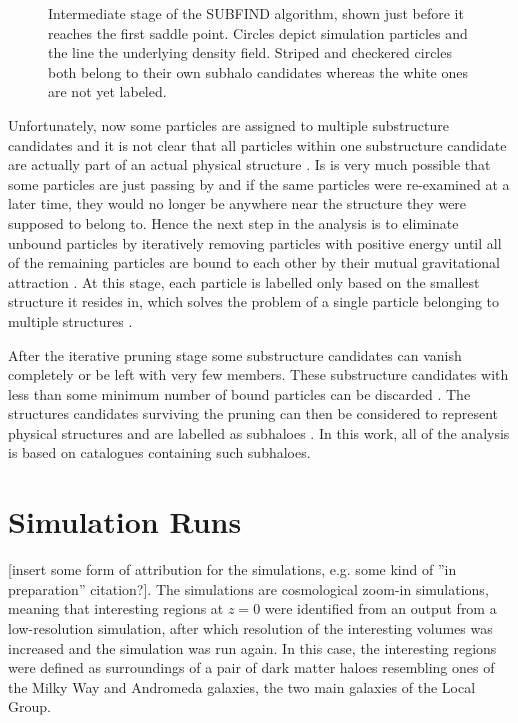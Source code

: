 \documentclass[english, oneside]{HYgradu}
\begin{document}
\begin{figure}
    \centering
    
    \caption{Intermediate stage of the SUBFIND algorithm, shown just before it reaches the first saddle point. Circles depict simulation particles and the line the underlying density field. Striped and checkered circles both belong to their own subhalo candidates whereas the white ones are not yet labeled.}\label{fig:subfind}
\end{figure}

Unfortunately, now some particles are assigned to multiple substructure candidates and it is not clear that all particles within one substructure candidate are actually part of an actual physical structure \citep{springel2001populating}. Is is very much possible that some particles are just passing by and if the same particles were re-examined at a later time, they would no longer be anywhere near the structure they were supposed to belong to. Hence the next step in the analysis is to eliminate unbound particles by iteratively removing particles with positive energy until all of the remaining particles are bound to each other by their mutual gravitational attraction \citep{springel2001populating}. At this stage, each particle is labelled only based on the smallest structure it resides in, which solves the problem of a single particle belonging to multiple structures \citep{springel2001populating}.

After the iterative pruning stage some substructure candidates can vanish completely or be left with very few members. These substructure candidates with less than some minimum number of bound particles can be discarded \citep{springel2001populating}. The structures candidates surviving the pruning can then be considered to represent physical structures and are labelled as subhaloes \citep{springel2001populating}. In this work, all of the analysis is based on catalogues containing such subhaloes. 

\section{Simulation Runs}
[insert some form of attribution for the simulations, e.g. some kind of ''in preparation'' citation?]. The simulations are cosmological zoom-in simulations, meaning that interesting regions at $z=0$ were identified from an output from a low-resolution simulation, after which resolution of the interesting volumes was increased and the simulation was run again. In this case, the interesting regions were defined as surroundings of a pair of dark matter haloes resembling ones of the Milky Way and Andromeda galaxies, the two main galaxies of the Local Group.
\end{document}
